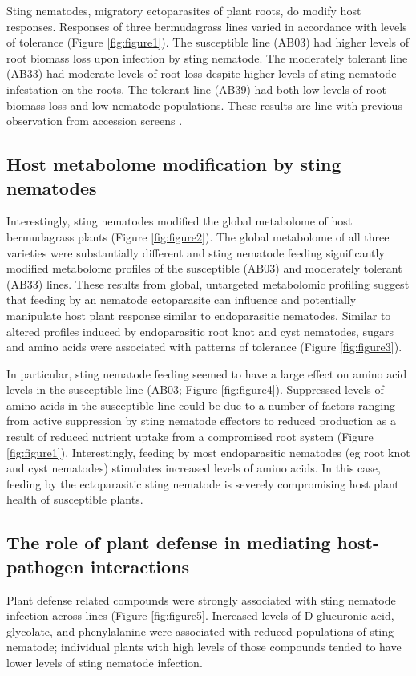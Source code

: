 \documentclass[9pt,lineno]{elife}
\begin{document}
Sting nematodes, migratory ectoparasites of plant roots, do modify host responses. Responses of three bermudagrass lines varied in accordance with levels of tolerance (Figure \ref{fig:figure1}).  The susceptible line (AB03) had higher levels of root biomass loss upon infection by sting nematode.  The moderately tolerant line (AB33) had moderate levels of root loss despite higher levels of sting nematode infestation on the roots.  The tolerant line (AB39) had both low levels of root biomass loss and low nematode populations.  These results are line with previous observation from accession screens \citep{pang2011bermudagrass, pang2011screening}.

\subsection{Host metabolome modification by sting nematodes}
Interestingly, sting nematodes modified the global metabolome of host bermudagrass plants (Figure \ref{fig:figure2}).  The global metabolome of all three varieties were substantially different and sting nematode feeding significantly modified metabolome profiles of the susceptible (AB03) and moderately tolerant (AB33) lines.  These results from global, untargeted metabolomic profiling suggest that feeding by an nematode ectoparasite can influence and potentially manipulate host plant response similar to endoparasitic nematodes.  Similar to altered profiles induced by endoparasitic root knot and cyst nematodes, sugars and amino acids were associated with patterns of tolerance (Figure \ref{fig:figure3}).  

In particular, sting nematode feeding seemed to have a large effect on amino acid levels in the susceptible line (AB03; Figure \ref{fig:figure4}). Suppressed levels of amino acids in the susceptible line could be due to a number of factors ranging from active suppression by sting nematode effectors to reduced production as a result of reduced nutrient uptake from a compromised root system (Figure \ref{fig:figure1}). Interestingly, feeding by most endoparasitic nematodes (eg root knot and cyst nematodes) stimulates increased levels of amino acids. In this case, feeding by the ectoparasitic sting nematode is severely compromising host plant health of susceptible plants. 
\subsection{The role of plant defense in mediating host-pathogen interactions}
Plant defense related compounds were strongly associated with sting nematode infection across lines (Figure \ref{fig:figure5}.  Increased levels of D-glucuronic acid, glycolate, and phenylalanine were associated with reduced populations of sting nematode; individual plants with high levels of those compounds tended to have lower levels of sting nematode infection.  
\end{document}
